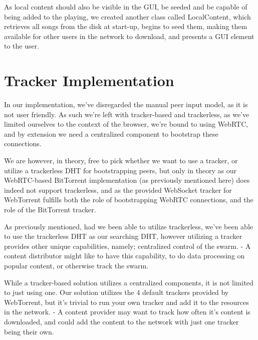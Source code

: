 As local content should also be visible in the \acs{GUI}, 
be seeded and be capable of being added to the playing,
we created another class called LocalContent,
which retrieves all songs from the disk at start-up,
begins to seed them, making them available for other users in the network to download,
and presents a \acs{GUI} element to the user.
\newline

\section{Tracker Implementation}
In our implementation, we've disregarded the manual peer input model, as it is
not user friendly. As such we're left with tracker-based and trackerless, as 
we've limited ourselves to the context of the browser, we're bound to using 
WebRTC, and by extension we need a centralized component to bootstrap these
connections. 

We are however, in theory, free to pick whether we want to use a tracker, or 
utilize a trackerless \acs{DHT} for bootstrapping peers, but only in theory as our
WebRTC-based BitTorrent implementation (as previously mentioned here) does
indeed not support trackerless, and as the provided WebSocket tracker for 
WebTorrent fulfills both the role of bootstrapping WebRTC connections, and the
role of the BitTorrent tracker.

As previously mentioned, had we been able to utilize trackerless, we've been
able to use the trackerless \acs{DHT} as our searching \acs{DHT}, however utilizing a
tracker provides other unique capabilities, namely; centralized control of the
swarm. 
\newline
- A content distributor might like to have this capability, to do data
processing on popular content, or otherwise track the swarm.

While a tracker-based solution utilizes a centralized components, it is not
limited to just using one. Our solution utilizes the 4 default trackers
provided by WebTorrent, but it's trivial to run your own tracker and add it to
the resources in the network.
\newline
- A content provider may want to track how often it's content is downloaded,
and could add the content to the network with just one tracker being their own.
